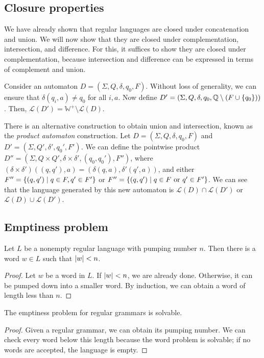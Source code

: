\subsection{Closure properties}
We have already shown that regular languages are closed under concatenation and union.
We will now show that they are closed under complementation, intersection, and difference.
For this, it suffices to show they are closed under complementation, because intersection and difference can be expressed in terms of complement and union.

Consider an automaton \( D = (\Sigma, Q, \delta, q_0, F) \).
Without loss of generality, we can ensure that \( \delta(q_i,a) \neq q_0 \) for all \( i, a \).
Now define \( D' = (\Sigma, Q, \delta, q_0, \mathbb Q \setminus (F \cup \qty{q_0})) \).
Then, \( \mathcal L(D') = \mathbb W^+ \setminus \mathcal L(D) \).

There is an alternative construction to obtain union and intersection, known as the \emph{product automaton} construction.
Let \( D = (\Sigma, Q, \delta, q_0, F) \) and \( D' = (\Sigma, Q', \delta', q_0', F') \).
We can define the pointwise product \( D'' = (\Sigma, Q \times Q', \delta \times \delta', (q_0, q_0'), F'') \), where \( (\delta \times \delta')((q,q'),a) = (\delta(q,a), \delta'(q',a)) \), and either \( F'' = \qty{(q,q') \mid q \in F, q' \in F'} \) or \( F'' = \qty{(q,q') \mid q \in F \text{ or } q' \in F'} \).
We can see that the language generated by this new automaton is \( \mathcal L(D) \cap \mathcal L(D') \) or \( \mathcal L(D) \cup \mathcal L(D') \).

\subsection{Emptiness problem}
\begin{lemma}
	Let \( L \) be a nonempty regular language with pumping number \( n \).
	Then there is a word \( w \in L \) such that \( \abs{w} < n \).
\end{lemma}
\begin{proof}
	Let \( w \) be a word in \( L \).
	If \( \abs{w} < n \), we are already done.
	Otherwise, it can be pumped down into a smaller word.
	By induction, we can obtain a word of length less than \( n \).
\end{proof}
\begin{corollary}
	The emptiness problem for regular grammars is solvable.
\end{corollary}
\begin{proof}
	Given a regular grammar, we can obtain its pumping number.
	We can check every word below this length because the word problem is solvable; if no words are accepted, the language is empty.
\end{proof}


